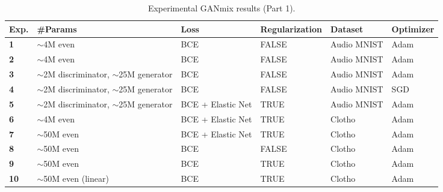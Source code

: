 \begin{table}[ht]
\caption{Experimental GANmix results (Part 1).}
\label{tab:ganmix-results-1}
\begin{tabularx}{\textwidth}{|l|X|X|X|X|X|}
\hline
\textbf{Exp.} & \textbf{\#Params}                           & \textbf{Loss}     & \textbf{Regularization} & \textbf{Dataset} & \textbf{Optimizer} \\ \hline
\textbf{1}    & $\sim$4M even                               & BCE               & FALSE                   & Audio MNIST      & Adam               \\ \hline
\textbf{2}    & $\sim$4M even                               & BCE               & FALSE                   & Audio MNIST      & Adam               \\ \hline
\textbf{3}    & $\sim$2M discriminator, $\sim$25M generator & BCE               & FALSE                   & Audio MNIST      & Adam               \\ \hline
\textbf{4}    & $\sim$2M discriminator, $\sim$25M generator & BCE               & FALSE                   & Audio MNIST      & SGD                \\ \hline
\textbf{5}    & $\sim$2M discriminator, $\sim$25M generator & BCE + Elastic Net & TRUE                    & Audio MNIST      & Adam               \\ \hline
\textbf{6}    & $\sim$4M even                               & BCE + Elastic Net & TRUE                    & Clotho           & Adam               \\ \hline
\textbf{7}    & $\sim$50M even                              & BCE + Elastic Net & TRUE                    & Clotho           & Adam               \\ \hline
\textbf{8}    & $\sim$50M even                              & BCE               & FALSE                   & Clotho           & Adam               \\ \hline
\textbf{9}    & $\sim$50M even                              & BCE               & TRUE                    & Clotho           & Adam               \\ \hline
\textbf{10}   & $\sim$50M even (linear)                             & BCE               & TRUE                    & Clotho           & Adam               \\ \hline
\end{tabularx}
\end{table}

